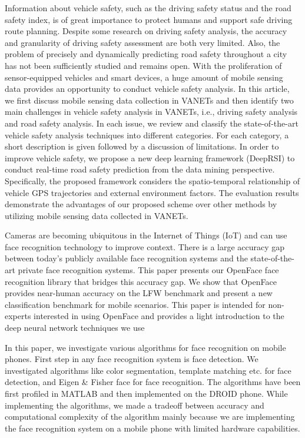 \documentclass{article}
\begin{document}
\medskip
Information about vehicle safety, such as the driving safety status and the road safety index, is of great importance to protect humans and support safe driving route planning. Despite some research on driving safety analysis, the accuracy and granularity of driving safety assessment are both very limited. Also, the problem of precisely and dynamically predicting road safety throughout a city has not been sufficiently studied and remains open. With the proliferation of sensor-equipped vehicles and smart devices, a huge amount of mobile sensing data provides an opportunity to conduct vehicle safety analysis. In this article, we first discuss mobile sensing data collection in VANETs and then identify two main challenges in vehicle safety analysis in VANETs, i.e., driving safety analysis and road safety analysis. In each issue, we review and classify the state-of-the-art vehicle safety analysis techniques into different categories. For each category, a short description is given followed by a discussion of limitations. In order to improve vehicle safety, we propose a new deep learning framework (DeepRSI) to conduct real-time road safety prediction from the data mining perspective. Specifically, the proposed framework considers the spatio-temporal relationship of vehicle GPS trajectories and external environment factors. The evaluation results demonstrate the advantages of our proposed scheme over other methods by utilizing mobile sensing data collected in VANETs.\cite{peng2018vehicle}

\medskip

Cameras are becoming ubiquitous in the Internet of Things (IoT) and can use face recognition technology to improve context. There is a large accuracy gap between today’s publicly available face
recognition systems and the state-of-the-art private face recognition systems. This paper presents
our OpenFace face recognition library that bridges this accuracy gap. We show that OpenFace provides near-human accuracy on the LFW benchmark and present a new classification benchmark
for mobile scenarios. This paper is intended for non-experts interested in using OpenFace and
provides a light introduction to the deep neural network techniques we use\cite{amos2016openface}

\medskip

In this paper, we investigate various algorithms for
face recognition on mobile phones. First step in any face
recognition system is face detection. We investigated
algorithms like color segmentation, template matching etc. for
face detection, and Eigen & Fisher face for face recognition.
The algorithms have been first profiled in MATLAB and then
implemented on the DROID phone. While implementing the
algorithms, we made a tradeoff between accuracy and
computational complexity of the algorithm mainly because we
are implementing the face recognition system on a mobile
phone with limited hardware capabilities. \cite{dave2010face}
\printbibliography
\end{document}
